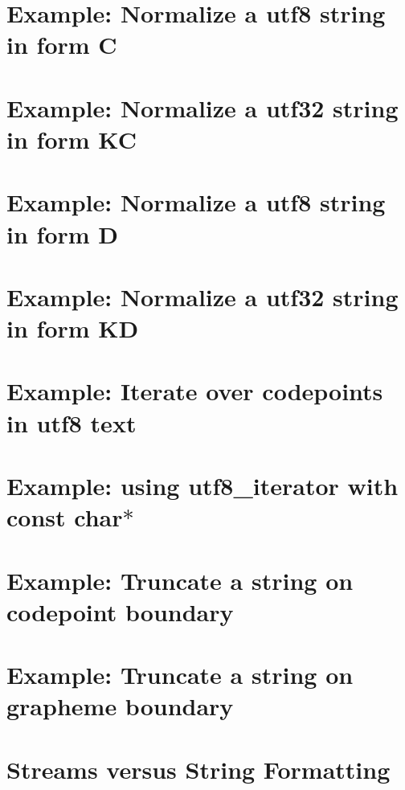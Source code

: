 \documentclass[twoside]{book}
\newcommand{\+}{\discretionary{\mbox{\scriptsize$\hookleftarrow$}}{}{}}
\begin{document}
\chapter{Example\+: Normalize a utf8 string in form C}
\label{normalization_form_kc}
\hypertarget{normalization_form_kc}{}

\chapter{Example\+: Normalize a utf32 string in form KC}
\label{normalization_form_kc_utf32}
\hypertarget{normalization_form_kc_utf32}{}

\chapter{Example\+: Normalize a utf8 string in form D}
\label{normalization_form_kd}
\hypertarget{normalization_form_kd}{}

\chapter{Example\+: Normalize a utf32 string in form KD}
\label{normalization_form_kd_utf32}
\hypertarget{normalization_form_kd_utf32}{}

\chapter{Example\+: Iterate over codepoints in utf8 text}
\label{simple_iteration}
\hypertarget{simple_iteration}{}

\chapter{Example\+: using utf8\+\_\+iterator with const char$\ast$}
\label{smallest_code}
\hypertarget{smallest_code}{}

\chapter{Example\+: Truncate a string on codepoint boundary}
\label{truncate_on_codepoint}
\hypertarget{truncate_on_codepoint}{}

\chapter{Example\+: Truncate a string on grapheme boundary}
\label{truncate_on_grapheme}
\hypertarget{truncate_on_grapheme}{}

\chapter{Streams versus String Formatting}
\label{md__home_ruoso_devel_u5e_StreamVsFormat}
\hypertarget{md__home_ruoso_devel_u5e_StreamVsFormat}{}

\end{document}

